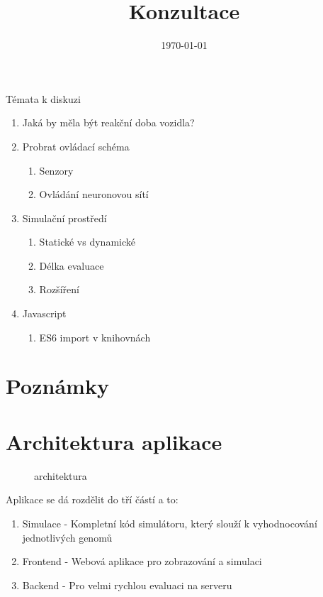 \documentclass[a4paper,11pt,twoside]{article}
\title{Konzultace}
\date{\today}
\begin{document}
	\maketitle
	Témata k diskuzi
	\begin{enumerate}
		\item Jaká by měla být reakční doba vozidla?
		\item Probrat ovládací schéma
			\begin{enumerate}
				\item Senzory
				\item Ovládání neuronovou sítí
			\end{enumerate}
		\item Simulační prostředí
			\begin{enumerate}
				\item Statické vs dynamické
				\item Délka evaluace
				\item Rozšíření
			\end{enumerate}
		\item Javascript
			\begin{enumerate}
				\item ES6 import v knihovnách
			\end{enumerate}
	\end{enumerate}
	
	\newpage
	\section{Poznámky}

	\newpage
	\section{Architektura aplikace}
	\begin{figure}[h!]
		\centering
		\caption{architektura}
	\end{figure}
	Aplikace se dá rozdělit do tří částí a to: 
	\begin{enumerate}
		\item Simulace - Kompletní kód simulátoru, který slouží k vyhodnocování jednotlivých genomů
		\item Frontend - Webová aplikace pro zobrazování a simulaci
		\item Backend - Pro velmi rychlou evaluaci na serveru
	\end{enumerate}
\end{document}

